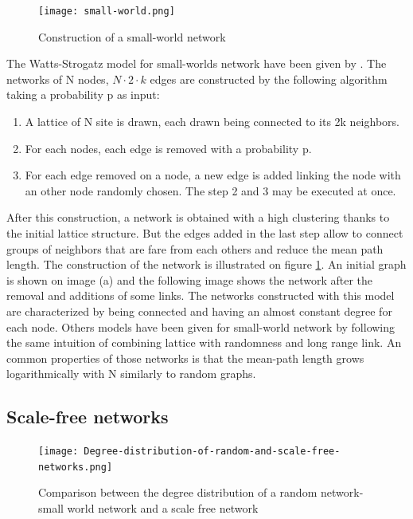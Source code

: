 \documentclass[a4paper, 12pt]{report}
\begin{document}
\begin{figure}
\centering
\texttt{[image: small-world.png]}
\caption{Construction of a small-world network \citep{small-world}}
\label{small-world_pictures}
\end{figure}

The Watts-Strogatz model for small-worlds network have been given by \cite{globalClustering1}. The networks of N nodes, $N \cdot 2 \cdot k$ edges are constructed by the following algorithm taking a probability p as input:
\begin{enumerate}
\item A lattice of N site is drawn, each drawn being connected to its 2k neighbors.
\item For each nodes, each edge is removed with a probability p. 
\item For each edge removed on a node, a new edge is added linking the node with an other node randomly chosen. The step 2 and 3 may be executed at once.
\end{enumerate}
After this construction, a network is obtained with a high clustering thanks to the initial lattice structure. But the edges added in the last step allow to connect groups of neighbors that are fare from each others and reduce the mean path length. The construction of the network is illustrated on figure \ref{small-world_pictures}. An initial graph is shown on image (a) and the following image shows the network after the removal and additions of some links. The networks constructed with this model are characterized by being connected and having an almost constant degree for each node. Others models have been given for small-world network by following the same intuition of combining lattice with randomness and long range link. An common properties of those networks is that the mean-path length grows logarithmically with N  similarly to random graphs.\citep{small-world, complex_networks}

\subsection{Scale-free networks}
\label{scale-free-section}
\begin{figure}
\centering
\texttt{[image: Degree-distribution-of-random-and-scale-free-networks.png]}
\caption{Comparison between the degree distribution of a random network- small world network and a scale free network \citep{scale-free_degree}}
\label{scale-free_degree}
\end{figure}
\end{document}
